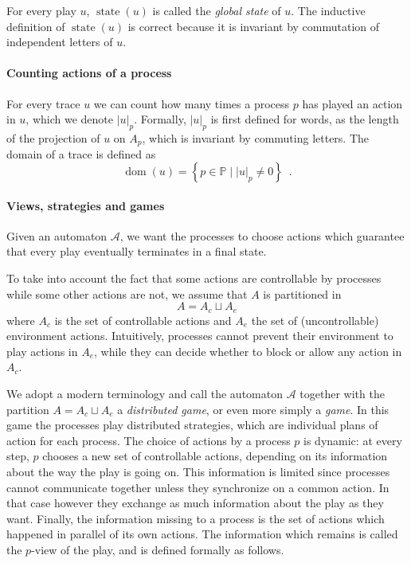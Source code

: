 \documentclass[a4paper,UKenglish]{lipics-v2016}
\newcommand{\PP}{\mathbb{P}}
\renewcommand{\AA}{\mathcal{A}}
\DeclareMathOperator{\dom}{dom}
\DeclareMathOperator{\state}{state}
\begin{document}
For every play $u$, $\state(u)$ is called the \emph{global state} of $u$.
The inductive definition of $\state(u)$ is correct because it is invariant by
commutation of independent letters of $u$.


\paragraph*{Counting actions of a process}
For every trace $u$ we can count how many times a process $p$
has played an action in $u$, which we denote $|u|_p$.
Formally, $|u|_p$ is first defined for words, as the length of the projection
of $u$ on $A_p$, which is invariant by commuting letters.
The domain of a trace is defined as 
\[
\dom(u) = \left\{ p \in \PP \mid |u|_p \neq 0\right\}\enspace.
\]

\paragraph*{Views, strategies and games}

Given an automaton $\AA$,
we want the processes to choose actions
which guarantee that
every play eventually terminates in a final state.

To take into account the fact that some actions are controllable by processes while some other actions are not, we assume that $A$ is partitioned in 
\[
A=A_c \sqcup A_e
\]
where $A_c$ is the set of controllable actions and
$A_e$ the set of (uncontrollable)  environment actions.
Intuitively, processes cannot prevent their environment to 
play actions in $A_e$, while they can decide whether to block or allow any action in $A_c$.

We adopt a modern terminology and call the automaton $\AA$ together with the partition
$A=A_c\sqcup A_e$ a \emph{distributed game}, or even more simply a \emph{game}.
In this game the processes play distributed strategies,
which are individual plans of action for each process.
The choice of actions by a process $p$ is dynamic: at every step, $p$ chooses a new set of controllable actions, depending on its  information about the way the play is going on. This information is limited since
processes cannot communicate together unless they synchronize on a
common action. In that case however they exchange as much information about the play as they want.
Finally, the information missing to a process is the set of actions which happened in parallel of its own actions.
The information which remains is called the $p$-view of the play,
and is defined formally as follows.
\end{document}
